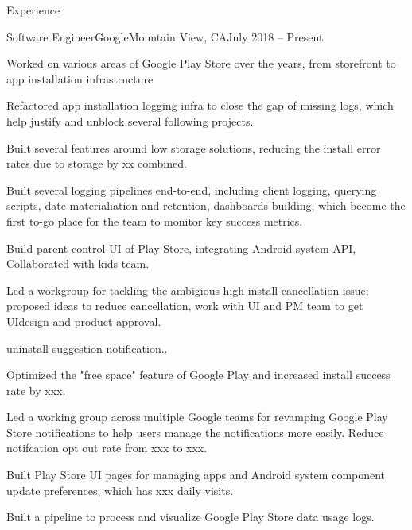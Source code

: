 \documentclass{resume} %
\begin{document}
\begin{rSection}{Experience}

\begin{rSubsection}{Software Engineer}{Google}{Mountain View, CA}{July 2018 -- Present}
\item Worked on various areas of Google Play Store over the years, from storefront to app installation infrastructure
\item Refactored app installation logging infra to close the gap of missing logs, which help justify and unblock several following projects.
\item Built several features around low storage solutions, reducing the install error rates due to storage by xx  combined.
\item Built several logging pipelines end-to-end, including client logging, querying scripts, date materialiation and retention, dashboards building, which become the first to-go place for the team to monitor key success metrics.
\item Build parent control UI of Play Store, integrating Android system API, Collaborated with kids team.
\item Led a workgroup for tackling the ambigious high install cancellation issue; proposed ideas to reduce cancellation, work with UI and PM team to get UIdesign and product approval. 
\item uninstall suggestion notification..
\item Optimized the "free space" feature of Google Play and increased install success rate by xxx. 
\item Led a working group across multiple Google teams for revamping Google Play Store notifications to help users manage the notifications more easily. Reduce notifcation opt out rate from xxx to xxx.
\item Built Play Store UI pages for managing apps and Android system component update preferences, which has xxx daily visits.
\item Built a pipeline to process and visualize Google Play Store data usage logs.
\end{rSubsection}


\end{rSection}
\end{document}
